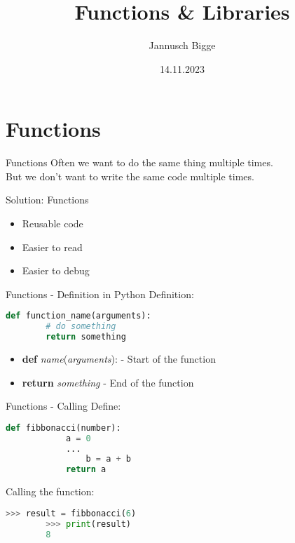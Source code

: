 \documentclass{beamer}
\title{Functions \& Libraries}
\author{Jannusch Bigge}
\date{14.11.2023}
\begin{document}
\begin{frame}
    \titlepage
\end{frame}

\section{Functions}

\begin{frame}{Functions}
    Often we want to do the same thing multiple times.\\ \pause 
    But we don't want to write the same code multiple times. \pause
    \begin{alertblock}{Solution: Functions}
        \begin{itemize}
            \item<3-> Reusable code
            \item<4-> Easier to read
            \item<5-> Easier to debug
        \end{itemize}
    \end{alertblock}
\end{frame}

\begin{frame}[fragile]{Functions - Definition in Python}
    Definition:
    \begin{lstlisting}[backgroundcolor = \color{lightgray},language=Python]
    def function_name(arguments):
        # do something
        return something
    \end{lstlisting}
    \begin{itemize}
        \item<2-> \textbf{def} \textit{name}(\textit{arguments}): - Start of the function
        \item<3-> \textbf{return} \textit{something} - End of the function
    \end{itemize}
\end{frame}

\begin{frame}[fragile]{Functions - Calling}
    Define:
    \begin{lstlisting}[backgroundcolor = \color{lightgray},language=Python]
        def fibbonacci(number):
            a = 0
            ...
                b = a + b
            return a 
    \end{lstlisting}
    Calling the function:
    \begin{lstlisting}[backgroundcolor = \color{lightgray},language=Python]
        >>> result = fibbonacci(6)
        >>> print(result)
        8
    \end{lstlisting}

\end{frame}
\end{document}
